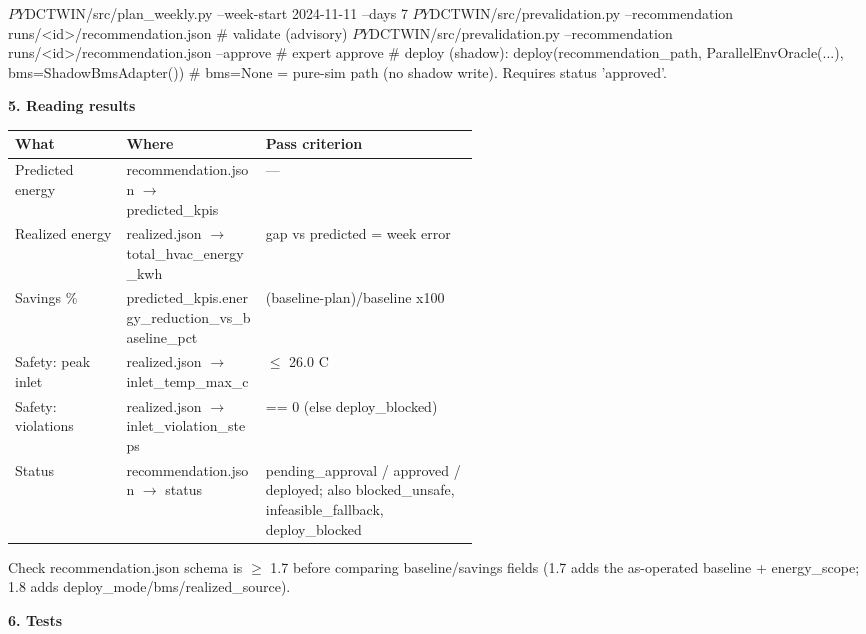 \documentclass[10pt]{article}
\begin{document}
\begin{cmd}
$PY $DCTWIN/src/plan_weekly.py --week-start 2024-11-11 --days 7
$PY $DCTWIN/src/prevalidation.py --recommendation runs/<id>/recommendation.json  # validate (advisory)
$PY $DCTWIN/src/prevalidation.py --recommendation runs/<id>/recommendation.json --approve  # expert approve
# deploy (shadow): deploy(recommendation_path, ParallelEnvOracle(...), bms=ShadowBmsAdapter())
#   bms=None = pure-sim path (no shadow write). Requires status 'approved'.
\end{cmd}
\smallskip\noindent\textbf{5. Reading results}\\[1pt]
\vspace{1pt}\begin{tabularx}{\linewidth}{@{}p{0.24\linewidth} p{0.30\linewidth} X@{}}
\toprule
\textbf{What} & \textbf{Where} & \textbf{Pass criterion} \\
\midrule
Predicted energy & recommendation.json $\rightarrow$ predicted\_\allowbreak{}kpis & — \\
Realized energy & realized.json $\rightarrow$ total\_\allowbreak{}hvac\_\allowbreak{}energy\_\allowbreak{}kwh & gap vs predicted = week error \\
Savings \% & predicted\_\allowbreak{}kpis.energy\_\allowbreak{}reduction\_\allowbreak{}vs\_\allowbreak{}baseline\_\allowbreak{}pct & (baseline-plan)/\allowbreak{}baseline x100 \\
Safety: peak inlet & realized.json $\rightarrow$ inlet\_\allowbreak{}temp\_\allowbreak{}max\_\allowbreak{}c & $\leq$ 26.0 C \\
Safety: violations & realized.json $\rightarrow$ inlet\_\allowbreak{}violation\_\allowbreak{}steps & == 0 (else deploy\_\allowbreak{}blocked) \\
Status & recommendation.json $\rightarrow$ status & pending\_\allowbreak{}approval /\allowbreak{} approved /\allowbreak{} deployed; also blocked\_\allowbreak{}unsafe, infeasible\_\allowbreak{}fallback, deploy\_\allowbreak{}blocked \\
\bottomrule
\end{tabularx}\vspace{2pt}
Check recommendation.json schema is $\geq$ 1.7 before comparing baseline/\allowbreak{}savings fields (1.7 adds the as-operated baseline + energy\_\allowbreak{}scope; 1.8 adds deploy\_\allowbreak{}mode/\allowbreak{}bms/\allowbreak{}realized\_\allowbreak{}source).

\smallskip\noindent\textbf{6. Tests}\\[1pt]
\end{document}
